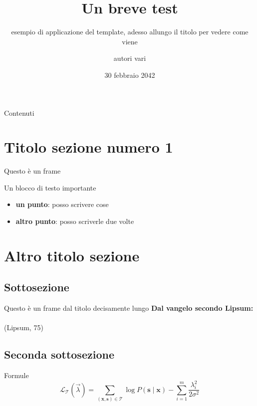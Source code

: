 \documentclass{beamer}
\title{Un breve test}
\subtitle{esempio di applicazione del template, adesso allungo il titolo per vedere come viene}
\author{autori vari}
\institute{Università di Trento}
\date{30 febbraio 2042}
\begin{document}

\begin{frame}
  \titlepage
\end{frame}

\begin{frame}{Contenuti}
  \tableofcontents
\end{frame}

\section{Titolo sezione numero 1}

\begin{frame}{Questo è un frame}
    \begin{block}{Un blocco di testo importante}
        \lipsum[66]
    \end{block}
    \pause
    \begin{itemize}
      \item \textbf{un punto}: posso scrivere cose
      \pause
      \item \textbf{altro punto}: posso scriverle due volte
    \end{itemize}
\end{frame}

\section{Altro titolo sezione}
\subsection{Sottosezione}
\begin{frame}{Questo è un frame dal titolo decisamente lungo}
    \textbf{Dal vangelo secondo Lipsum:} \\
    \pause
    \textit{\lipsum[75]} \\ 
    (Lipsum, 75)
\end{frame}

\subsection{Seconda sottosezione}

\begin{frame}{Formule}
    \[
    \mathcal L_{\mathcal T}(\vec{\lambda})
    = \sum_{(\mathbf{x},\mathbf{s})\in \mathcal T}
       \log P(\mathbf{s}\mid\mathbf{x}) - \sum_{i=1}^m
       \frac{\lambda_i^2}{2\sigma^2}
    \]
\end{frame}
\end{document}
